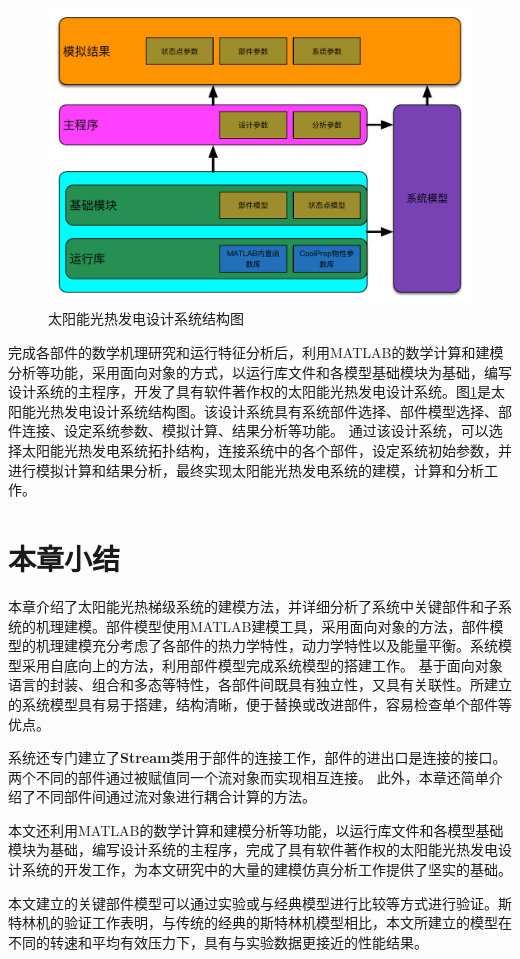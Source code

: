 \begin{figure}[htbp]
\begin{center}
	\includegraphics[width = 0.8\columnwidth]{fig/SystemFlow}
	\caption{太阳能光热发电设计系统结构图}
	\label{fig:SystemFlow}
\end{center}
\end{figure}

完成各部件的数学机理研究和运行特征分析后，利用MATLAB的数学计算和建模分析等功能，采用面向对象的方式，以运行库文件和各模型基础模块为基础，编写设计系统的主程序，开发了具有软件著作权的太阳能光热发电设计系统。图\ref{fig:SystemFlow}是太阳能光热发电设计系统结构图。该设计系统具有系统部件选择、部件模型选择、部件连接、设定系统参数、模拟计算、结果分析等功能。
通过该设计系统，可以选择太阳能光热发电系统拓扑结构，连接系统中的各个部件，设定系统初始参数，并进行模拟计算和结果分析，最终实现太阳能光热发电系统的建模，计算和分析工作。

\section{本章小结}

本章介绍了太阳能光热梯级系统的建模方法，并详细分析了系统中关键部件和子系统的机理建模。部件模型使用MATLAB建模工具，采用面向对象的方法，部件模型的机理建模充分考虑了各部件的热力学特性，动力学特性以及能量平衡。系统模型采用自底向上的方法，利用部件模型完成系统模型的搭建工作。
基于面向对象语言的封装、组合和多态等特性，各部件间既具有独立性，又具有关联性。所建立的系统模型具有易于搭建，结构清晰，便于替换或改进部件，容易检查单个部件等优点。

系统还专门建立了\textbf{Stream}类用于部件的连接工作，部件的进出口是连接的接口。两个不同的部件通过被赋值同一个流对象而实现相互连接。
此外，本章还简单介绍了不同部件间通过流对象进行耦合计算的方法。

本文还利用MATLAB的数学计算和建模分析等功能，以运行库文件和各模型基础模块为基础，编写设计系统的主程序，完成了具有软件著作权的太阳能光热发电设计系统的开发工作，为本文研究中的大量的建模仿真分析工作提供了坚实的基础。

本文建立的关键部件模型可以通过实验或与经典模型进行比较等方式进行验证。斯特林机的验证工作表明，与传统的经典的斯特林机模型相比，本文所建立的模型在不同的转速和平均有效压力下，具有与实验数据更接近的性能结果。